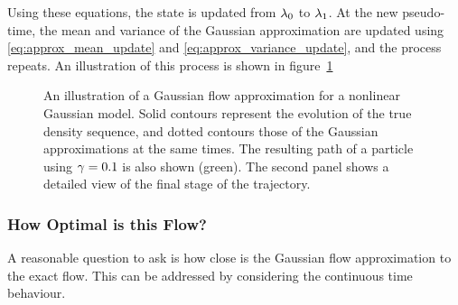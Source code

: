 \documentclass[12pt]{article}
\begin{document}
Using these equations, the state is updated from $\lambda_0$ to $\lambda_1$. At the new pseudo-time, the mean and variance of the Gaussian approximation are updated using \eqref{eq:approx_mean_update} and \eqref{eq:approx_variance_update}, and the process repeats. An illustration of this process is shown in figure~\ref{approx_gaussian_flow_example}

\begin{figure}
\centering
\subfloat[]{  }
\subfloat[]{  }
\caption{An illustration of a Gaussian flow approximation for a nonlinear Gaussian model. Solid contours represent the evolution of the true density sequence, and dotted contours those of the Gaussian approximations at the same times. The resulting path of a particle using $\gamma=0.1$ is also shown (green). The second panel shows a detailed view of the final stage of the trajectory.}
\label{approx_gaussian_flow_example}
\end{figure}



\subsubsection{How Optimal is this Flow?}

A reasonable question to ask is how close is the Gaussian flow approximation to the exact flow. This can be addressed by considering the continuous time behaviour.
\end{document}
